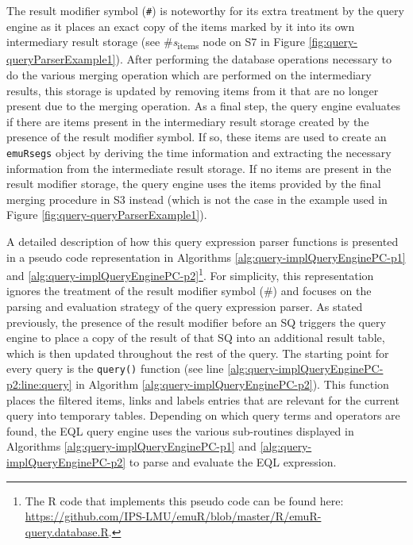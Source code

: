 \documentclass[]{book}
\let\rmarkdownfootnote\footnote%
\def\footnote{\protect\rmarkdownfootnote}
\theoremstyle{definition}
\theoremstyle{definition}
\theoremstyle{definition}
\theoremstyle{remark}
\begin{document}
The result modifier symbol (\texttt{\#}) is noteworthy for its extra
treatment by the query engine as it places an exact copy of the items
marked by it into its own intermediary result storage (see
\#\emph{s}\textsubscript{items} node on S7 in Figure
\ref{fig:query-queryParserExample1}). After performing the database
operations necessary to do the various merging operation which are
performed on the intermediary results, this storage is updated by
removing items from it that are no longer present due to the merging
operation. As a final step, the query engine evaluates if there are
items present in the intermediary result storage created by the presence
of the result modifier symbol. If so, these items are used to create an
\texttt{emuRsegs} object by deriving the time information and extracting
the necessary information from the intermediate result storage. If no
items are present in the result modifier storage, the query engine uses
the items provided by the final merging procedure in S3 instead (which
is not the case in the example used in Figure
\ref{fig:query-queryParserExample1}).

A detailed description of how this query expression parser functions is
presented in a pseudo code representation in Algorithms
\ref{alg:query-implQueryEnginePC-p1} and
\ref{alg:query-implQueryEnginePC-p2}\footnote{The R code that implements
  this pseudo code can be found here:
  \url{https://github.com/IPS-LMU/emuR/blob/master/R/emuR-query.database.R}.}.
For simplicity, this representation ignores the treatment of the result
modifier symbol (\#) and focuses on the parsing and evaluation strategy
of the query expression parser. As stated previously, the presence of
the result modifier before an SQ triggers the query engine to place a
copy of the result of that SQ into an additional result table, which is
then updated throughout the rest of the query. The starting point for
every query is the \texttt{query()} function (see line
\ref{alg:query-implQueryEnginePC-p2:line:query} in Algorithm
\ref{alg:query-implQueryEnginePC-p2}). This function places the filtered
items, links and labels entries that are relevant for the current query
into temporary tables. Depending on which query terms and operators are
found, the EQL query engine uses the various sub-routines displayed in
Algorithms \ref{alg:query-implQueryEnginePC-p1} and
\ref{alg:query-implQueryEnginePC-p2} to parse and evaluate the EQL
expression.
\end{document}
